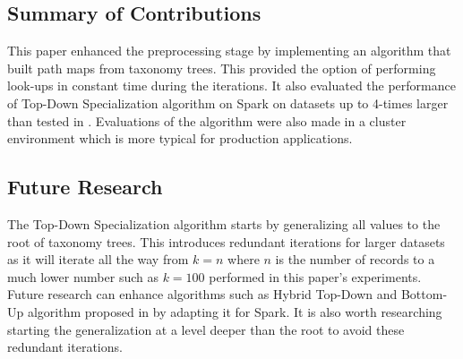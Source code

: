 \documentclass[11pt]{article}       %
\begin{document}
\subsection{Summary of Contributions}

This paper enhanced the preprocessing stage by implementing an algorithm that built path maps from taxonomy trees. This provided the option of performing look-ups in constant time during the iterations. It also evaluated the performance of Top-Down Specialization algorithm on Spark on datasets up to 4-times larger than tested in \cite{Sopaoglu:2017}. Evaluations of the algorithm were also made in a cluster environment which is more typical for production applications.

\subsection{Future Research}

The Top-Down Specialization algorithm starts by generalizing all values to the root of taxonomy trees. This introduces redundant iterations for larger datasets as it will iterate all the way from \(k=n\) where $n$ is the number of records to a much lower number such as \(k=100\) performed in this paper's experiments. Future research can enhance algorithms such as Hybrid Top-Down and Bottom-Up algorithm proposed in \cite{Zhang:2013} by adapting it for Spark. It is also worth researching starting the generalization at a level deeper than the root to avoid these redundant iterations. 



\end{document}
